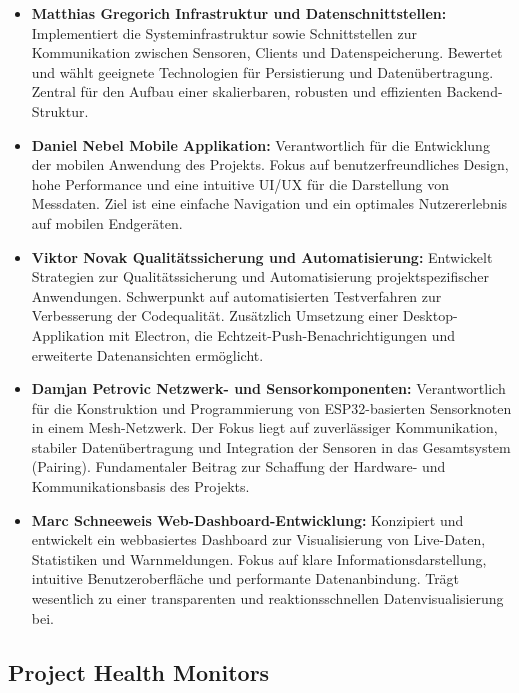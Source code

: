 \documentclass{article}
\begin{document}
\begin{itemize}
  \item \textbf{Matthias Gregorich \textendash{} Infrastruktur und Datenschnittstellen:} Implementiert die Systeminfrastruktur sowie Schnittstellen zur Kommunikation zwischen Sensoren, Clients und Datenspeicherung. Bewertet und wählt geeignete Technologien für Persistierung und Datenübertragung. Zentral für den Aufbau einer skalierbaren, robusten und effizienten Backend-Struktur.
  
  \item \textbf{Daniel Nebel \textendash{} Mobile Applikation:} Verantwortlich für die Entwicklung der mobilen Anwendung des Projekts. Fokus auf benutzerfreundliches Design, hohe Performance und eine intuitive UI/UX für die Darstellung von Messdaten. Ziel ist eine einfache Navigation und ein optimales Nutzererlebnis auf mobilen Endgeräten.
  
  \item \textbf{Viktor Novak \textendash{} Qualitätssicherung und Automatisierung:} Entwickelt Strategien zur Qualitätssicherung und Automatisierung projektspezifischer Anwendungen. Schwerpunkt auf automatisierten Testverfahren zur Verbesserung der Codequalität. Zusätzlich Umsetzung einer Desktop-Applikation mit Electron, die Echtzeit-Push-Benachrichtigungen und erweiterte Datenansichten ermöglicht.
  
  \item \textbf{Damjan Petrovic \textendash{} Netzwerk- und Sensorkomponenten:} Verantwortlich für die Konstruktion und Programmierung von ESP32-basierten Sensorknoten in einem Mesh-Netzwerk. Der Fokus liegt auf zuverlässiger Kommunikation, stabiler Datenübertragung und Integration der Sensoren in das Gesamtsystem (Pairing). Fundamentaler Beitrag zur Schaffung der Hardware- und Kommunikationsbasis des Projekts.
  
  \item \textbf{Marc Schneeweis \textendash{} Web-Dashboard-Entwicklung:} Konzipiert und entwickelt ein webbasiertes Dashboard zur Visualisierung von Live-Daten, Statistiken und Warnmeldungen. Fokus auf klare Informationsdarstellung, intuitive Benutzeroberfläche und performante Datenanbindung. Trägt wesentlich zu einer transparenten und reaktionsschnellen Datenvisualisierung bei.
\end{itemize}





\subsection{Project Health Monitors}
\end{document}
